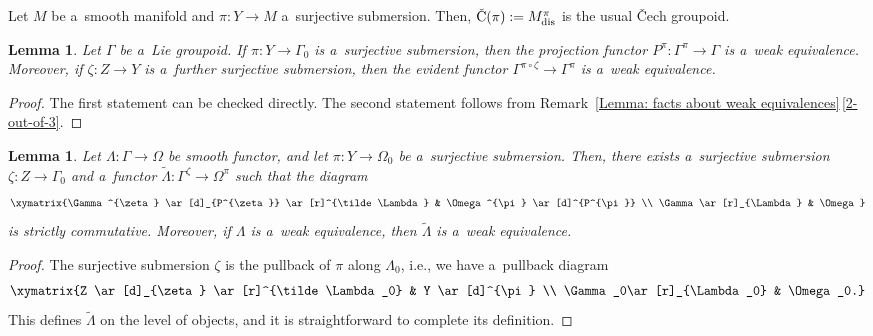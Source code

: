 \documentclass[pdftex]{sigma}
\numberwithin{equation}{section}
\newtheorem{Lemma}[Theorem]{Lemma}
\newcommand{\alxydim}[2]{\begin{aligned}\xymatrix#1{#2}\end{aligned}}
\begin{document}
\begin{Example}\label{Example : Cech groupoid and weak equivalences}
 Let $M$ be a~smooth manifold and $\pi\colon Y \to M$ a~surjective submersion. Then, $\text{\v C}(\pi):=M_{\rm dis}^{\pi}$ is the usual \v Cech groupoid.
\end{Example}

\begin{Lemma}
Let $\Gamma$ be a~Lie groupoid. If $\pi\colon Y \to \Gamma_0$ is a~surjective submersion, then the projection functor $P^{\pi}\colon \Gamma^{\pi} \to \Gamma$ is a~weak equivalence. Moreover, if $\zeta\colon Z \to Y$ is a~further surjective submersion, then the evident functor $\Gamma^{\pi \circ \zeta} \to \Gamma^{\pi}$ is a~weak equivalence.
\end{Lemma}

\begin{proof}
The first statement can be checked directly. The second statement follows from Remark~\ref{Lemma: facts about weak equivalences}\,\ref{2-out-of-3}.
\end{proof}

\begin{Lemma}
\label{pullback-of-coverings}
Let $\Lambda\colon \Gamma \to \Omega$ be smooth functor, and let $\pi\colon Y \to \Omega_0$ be a~surjective submersion. Then, there exists a~surjective submersion $\zeta\colon Z \to \Gamma_0$ and a~functor $\tilde\Lambda\colon \Gamma^{\zeta} \to \Omega^{\pi}$ such that the diagram
\begin{equation*}
\alxydim{}{\Gamma^{\zeta} \ar[d]_{P^{\zeta}} \ar[r]^{\tilde\Lambda} & \Omega^{\pi} \ar[d]^{P^{\pi}} \\ \Gamma \ar[r]_{\Lambda} & \Omega}
\end{equation*}
is strictly commutative. Moreover, if $\Lambda$ is a~weak equivalence, then $\tilde\Lambda$ is a~weak equivalence.
\end{Lemma}
\begin{proof}
The surjective submersion $\zeta$ is the pullback of $\pi$ along $\Lambda_0$, i.e., we have a~pullback diagram
\begin{equation*}
\alxydim{}{Z \ar[d]_{\zeta} \ar[r]^{\tilde\Lambda_0} & Y \ar[d]^{\pi} \\ \Gamma_0\ar[r]_{\Lambda_0} & \Omega_0.}
\end{equation*}
This defines $\tilde\Lambda$ on the level of objects, and it is straightforward to complete its definition.
\end{proof}
\end{document}
